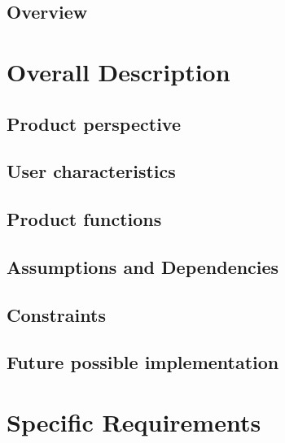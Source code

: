\documentclass[12pt, a4paper]{article}
\begin{document}
    	\subsection{Overview}
    	
    	
    	
    \newpage
    \section{Overall Description}
    
    	\subsection{Product perspective}
    	
    	
    	\subsection{User characteristics}
    	
    	
    	\subsection{Product functions}
    	
    	
    	\subsection{Assumptions and Dependencies}
    	
    	
    	\subsection{Constraints}
    	
    		
    	\subsection{Future possible implementation}
    	
    	
    	
    \newpage	    
    \section{Specific Requirements}
    
\end{document}
